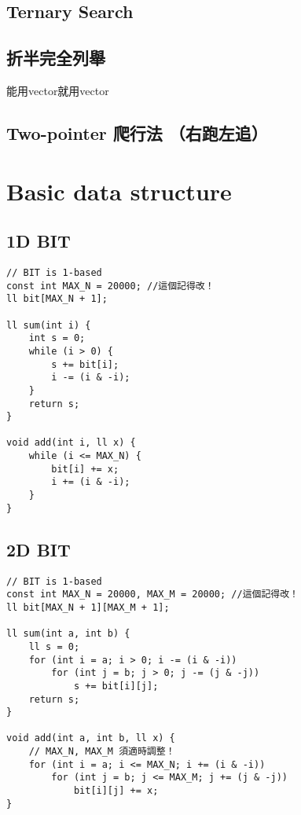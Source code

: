 \documentclass[10pt,oneside]{article}
\begin{document}
\begin{landscape}
\begin{multicols}{2}
\subsection{Ternary Search}

\subsection{折半完全列舉}

能用vector就用vector

\subsection{Two-pointer 爬行法 （右跑左追）}


\section{Basic data structure}

\subsection{1D BIT}

\begin{lstlisting}
// BIT is 1-based
const int MAX_N = 20000; //這個記得改！
ll bit[MAX_N + 1];

ll sum(int i) {
    int s = 0;
    while (i > 0) {
        s += bit[i];
        i -= (i & -i);
    }
    return s;
}

void add(int i, ll x) {
    while (i <= MAX_N) {
        bit[i] += x;
        i += (i & -i);
    }
}
\end{lstlisting}

\subsection{2D BIT}

\begin{lstlisting}
// BIT is 1-based
const int MAX_N = 20000, MAX_M = 20000; //這個記得改！
ll bit[MAX_N + 1][MAX_M + 1];

ll sum(int a, int b) {
    ll s = 0;
    for (int i = a; i > 0; i -= (i & -i))
        for (int j = b; j > 0; j -= (j & -j))
            s += bit[i][j];
    return s;
}

void add(int a, int b, ll x) {
	// MAX_N, MAX_M 須適時調整！
    for (int i = a; i <= MAX_N; i += (i & -i))
        for (int j = b; j <= MAX_M; j += (j & -j))
            bit[i][j] += x;
}
\end{lstlisting}


\end{multicols}
\end{landscape}
\end{document}
